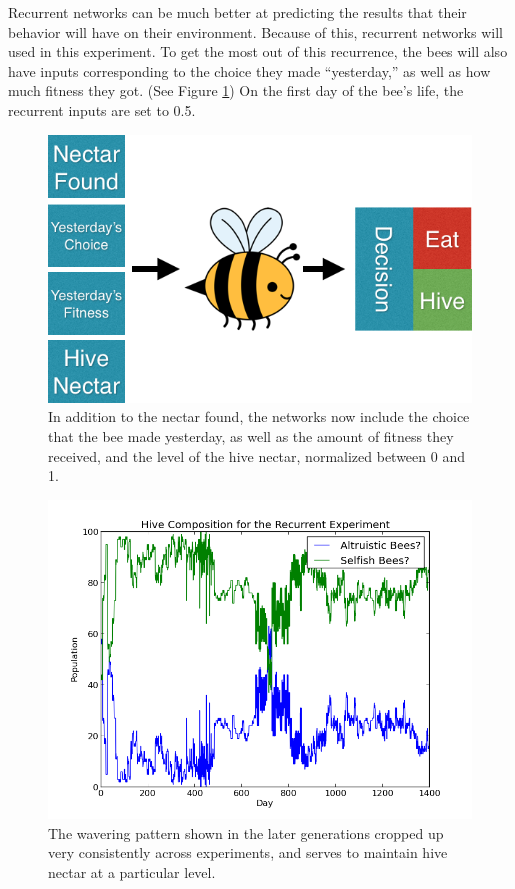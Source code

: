 \documentclass[twoside]{article}
\begin{document}
\begin{multicols}{2}
			Recurrent networks can be much better at predicting the results that their behavior will have on their environment. Because of this, recurrent networks will used in this experiment. To get the most out of this recurrence, the bees will also have inputs corresponding to the choice they made ``yesterday,'' as well as how much fitness they got. (See Figure \ref{fig:recurrent_system}) On the first day of the bee's life, the recurrent inputs are set to 0.5.


			\begin{figure}[H]
				\begin{center}
					\includegraphics[width=.45\textwidth]{bee_diagrams/recurrent_system.png}
				\end{center}
				\caption{In addition to the nectar found, the networks now include the choice that the bee made yesterday, as well as the amount of fitness they received, and the level of the hive nectar, normalized between 0 and 1.}
				\label{fig:recurrent_system}
			\end{figure}

			\begin{figure}[H]
				\begin{center}
					\includegraphics[width=.5\textwidth]{results/recurrent_comp.png}
				\end{center}
				\caption{The wavering pattern shown in the later generations cropped up very consistently across experiments, and serves to maintain hive nectar at a particular level.}
				\label{fig:recurrent_composition}
			\end{figure}


\end{multicols}
\end{document}
